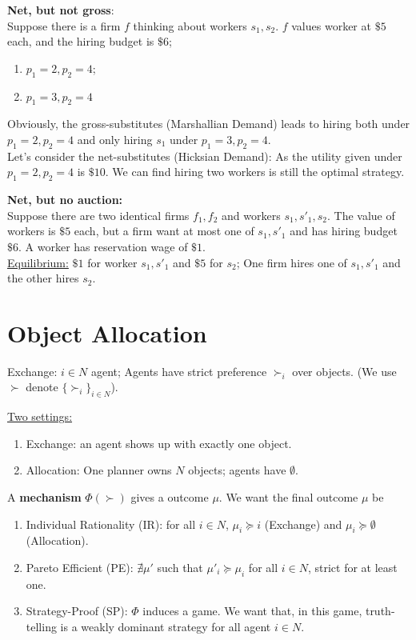 \documentclass[11pt]{elegantbook}
\begin{document}
\begin{example}
\textbf{Net, but not gross}:\\
Suppose there is a firm $f$ thinking about workers $s_1,s_2$. $f$ values worker at $\$ 5$ each, and the hiring budget is $\$ 6$;
\begin{enumerate}[$\circ$]
    \item $p_1=2,p_2=4$;
    \item $p_1=3,p_2=4$
\end{enumerate}
Obviously, the gross-substitutes (Marshallian Demand) leads to hiring both under $p_1=2,p_2=4$ and only hiring $s_1$ under $p_1=3,p_2=4$.\\
Let's consider the net-substitutes (Hicksian Demand): As the utility given under $p_1=2,p_2=4$ is $\$ 10$. We can find hiring two workers is still the optimal strategy.
\end{example}


\begin{example}
    \textbf{Net, but no auction:}\\
    Suppose there are two identical firms $f_1,f_2$ and workers $s_1,s'_1,s_2$. The value of workers is $\$ 5$ each, but a firm want at most one of $s_1,s'_1$ and has hiring budget $\$ 6$. A worker has reservation wage of $\$ 1$.\\
    \underline{Equilibrium:} $\$1$ for worker $s_1,s'_1$ and $\$ 5$ for $s_2$; One firm hires one of $s_1,s'_1$ and the other hires $s_2$.
\end{example}


\section{Object Allocation}
Exchange: $i\in N$ agent; Agents have strict preference $\succ_i$ over objects. (We use $\succ$ denote $\{\succ_i\}_{i\in N}$).

\underline{Two settings:}
\begin{enumerate}
    \item Exchange: an agent shows up with exactly one object.
    \item Allocation: One planner owns $N$ objects; agents have $\emptyset$.
\end{enumerate}

A \textbf{mechanism} $\Phi(\succ)$ gives a outcome $\mu$.
We want the final outcome $\mu$ be
\begin{enumerate}
    \item Individual Rationality (IR): for all $i\in N$, $\mu_i\succeq i$ (Exchange) and $\mu_i\succeq \emptyset$ (Allocation).
    \item Pareto Efficient (PE): $\nexists \mu'$ such that $\mu'_i\succeq \mu_i$ for all $i\in N$, strict for at least one.
    \item Strategy-Proof (SP): $\Phi$ induces a game. We want that, in this game, truth-telling is a weakly dominant strategy for all agent $i\in N$.
\end{enumerate}
\end{document}
